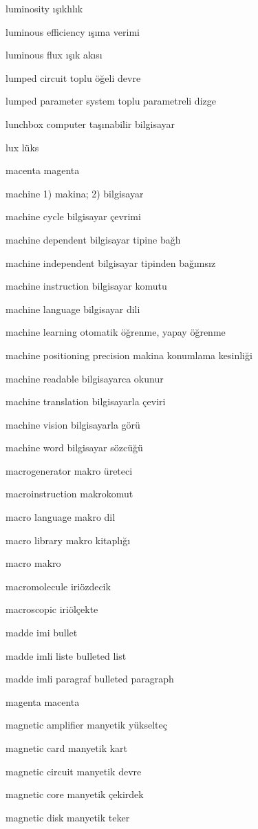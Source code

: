 \documentclass[12pt,fleqn]{article}\usepackage{../../common}
\begin{document}
luminosity ışıklılık

luminous efficiency ışıma verimi

luminous flux ışık akısı

lumped circuit toplu öğeli devre

lumped parameter system toplu parametreli dizge

lunchbox computer taşınabilir bilgisayar

lux lüks

macenta magenta

machine 1) makina; 2) bilgisayar

machine cycle bilgisayar çevrimi

machine dependent bilgisayar tipine bağlı

machine independent bilgisayar tipinden bağımsız

machine instruction bilgisayar komutu

machine language bilgisayar dili

machine learning otomatik öğrenme, yapay öğrenme

machine positioning precision makina konumlama kesinliği

machine readable bilgisayarca okunur

machine translation bilgisayarla çeviri

machine vision bilgisayarla görü

machine word bilgisayar sözcüğü

macrogenerator makro üreteci

macroinstruction makrokomut

macro language makro dil

macro library makro kitaplığı

macro makro

macromolecule iriözdecik

macroscopic iriölçekte

madde imi bullet

madde imli liste bulleted list

madde imli paragraf bulleted paragraph

magenta macenta

magnetic amplifier manyetik yükselteç

magnetic card manyetik kart

magnetic circuit manyetik devre

magnetic core manyetik çekirdek

magnetic disk manyetik teker
\end{document}
